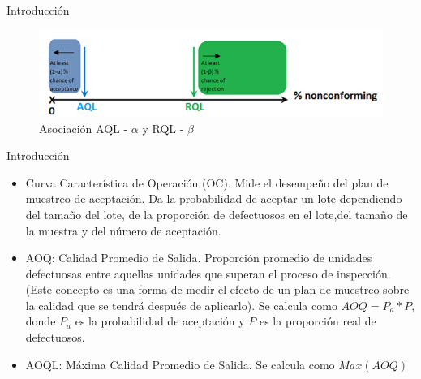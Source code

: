 \documentclass[10pt]{beamer}
\begin{document}
\begin{frame}{Introducción}
\begin{figure}[h!]
  \centering
  \includegraphics[scale=0.6]{FigurasUV/AQLRQL.png}
  \caption{Asociación AQL - $\alpha$ y RQL - $\beta$}
\end{figure}
\end{frame}



\begin{frame}{Introducción}
\begin{itemize}
\item Curva Característica de Operación (OC). Mide el desempeño del plan de muestreo de aceptación. Da la probabilidad de aceptar un lote dependiendo del tamaño del lote, de la proporción de defectuosos en el lote,del tamaño de la muestra y del número de aceptación.
\item AOQ: Calidad Promedio de Salida. Proporción promedio de unidades defectuosas entre aquellas unidades que superan el proceso de inspección. (Este concepto es una forma de medir el efecto de un plan de muestreo sobre la calidad que se tendrá después de aplicarlo). Se calcula como $AOQ=P_a*P$, donde $P_a$ es la probabilidad de aceptación y $P$ es la proporción real de defectuosos.
\item AOQL: Máxima Calidad Promedio de Salida. Se calcula como $Max(AOQ)$
\end{itemize}
\end{frame}
\end{document}
